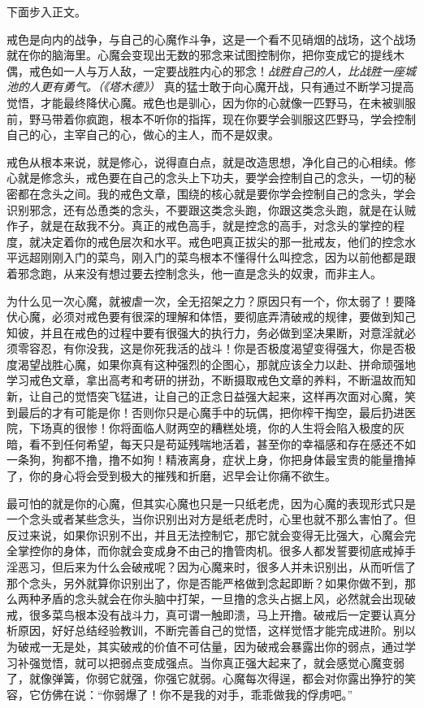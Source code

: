 下面步入正文。

戒色是向内的战争，与自己的心魔作斗争，这是一个看不见硝烟的战场，这个战场就在你的脑海里。心魔会变现出无数的邪念来试图控制你，把你变成它的提线木偶，戒色如一人与万人敌，一定要战胜内心的邪念！\textit{战胜自己的人，比战胜一座城池的人更有勇气。（《塔木德》）} 真的猛士敢于向心魔开战，只有通过不断学习提高觉悟，才能最终降伏心魔。戒色也是驯心，因为你的心就像一匹野马，在未被驯服前，野马带着你疯跑，根本不听你的指挥，现在你要学会驯服这匹野马，学会控制自己的心，主宰自己的心，做心的主人，而不是奴隶。

戒色从根本来说，就是修心，说得直白点，就是改造思想，净化自己的心相续。修心就是修念头，戒色要在自己的念头上下功夫，要学会控制自己的念头，一切的秘密都在念头之间。我的戒色文章，围绕的核心就是要你学会控制自己的念头，学会识别邪念，还有怂恿类的念头，不要跟这类念头跑，你跟这类念头跑，就是在认贼作子，就是在敌我不分。真正的戒色高手，就是控念的高手，对念头的掌控的程度，就决定着你的戒色层次和水平。戒色吧真正拔尖的那一批戒友，他们的控念水平远超刚刚入门的菜鸟，刚入门的菜鸟根本不懂得什么叫控念，因为以前他都是跟着邪念跑，从来没有想过要去控制念头，他一直是念头的奴隶，而非主人。

为什么见一次心魔，就被虐一次，全无招架之力？原因只有一个，你太弱了！要降伏心魔，必须对戒色要有很深的理解和体悟，要彻底弄清破戒的规律，要做到知己知彼，并且在戒色的过程中要有很强大的执行力，务必做到坚决果断，对意淫就必须零容忍，有你没我，这是你死我活的战斗！你是否极度渴望变得强大，你是否极度渴望战胜心魔，如果你真有这种强烈的企图心，那就应该全力以赴、拼命顽强地学习戒色文章，拿出高考和考研的拼劲，不断摄取戒色文章的养料，不断温故而知新，让自己的觉悟突飞猛进，让自己的正念日益强大起来，这样再次面对心魔，笑到最后的才有可能是你！否则你只是心魔手中的玩偶，把你榨干掏空，最后扔进医院，下场真的很惨！你将面临人财两空的糟糕处境，你的人生将会陷入极度的灰暗，看不到任何希望，每天只是苟延残喘地活着，甚至你的幸福感和存在感还不如一条狗，狗都不撸，撸不如狗！精液离身，症状上身，你把身体最宝贵的能量撸掉了，你的身心将会受到极大的摧残和折磨，迟早会让你痛不欲生。

最可怕的就是你的心魔，但其实心魔也只是一只纸老虎，因为心魔的表现形式只是一个念头或者某些念头，当你识别出对方是纸老虎时，心里也就不那么害怕了。但反过来说，如果你识别不出，并且无法控制它，那它就会变得无比强大，心魔会完全掌控你的身体，而你就会变成身不由己的撸管肉机。很多人都发誓要彻底戒掉手淫恶习，但后来为什么会破戒呢？因为心魔来时，很多人并未识别出，从而听信了那个念头，另外就算你识别出了，你是否能严格做到念起即断？如果你做不到，那么两种矛盾的念头就会在你头脑中打架，一旦撸的念头占据上风，必然就会出现破戒，很多菜鸟根本没有战斗力，真可谓一触即溃，马上开撸。破戒后一定要认真分析原因，好好总结经验教训，不断完善自己的觉悟，这样觉悟才能完成进阶。别以为破戒一无是处，其实破戒的价值不可估量，因为破戒会暴露出你的弱点，通过学习补强觉悟，就可以把弱点变成强点。当你真正强大起来了，就会感觉心魔变弱了，就像弹簧，你弱它就强，你强它就弱。心魔每次得逞，都会对你露出狰狞的笑容，它仿佛在说：“你弱爆了！你不是我的对手，乖乖做我的俘虏吧。”

